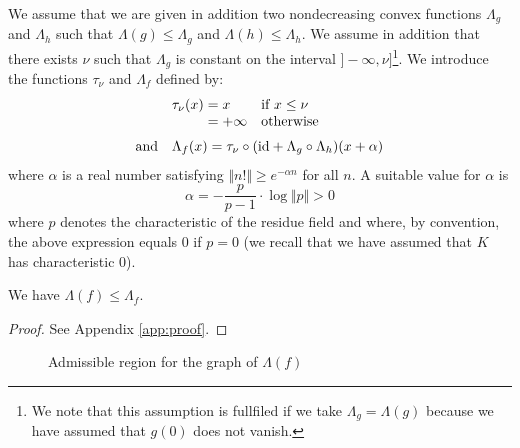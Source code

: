 \documentclass{sig-alternate}
\begin{document}
We assume that we are given in addition two nondecreasing convex 
functions $\Lambda_g$ and $\Lambda_h$ such that $\Lambda(g) \leq 
\Lambda_g$ and $\Lambda(h) \leq \Lambda_h$. We assume in addition that 
there exists $\nu$ such that $\Lambda_g$ is constant on the interval 
$]{-}\infty, \nu]$\footnote{We note that this assumption is fullfiled if 
we take $\Lambda_g = \Lambda(g)$ because we have assumed that $g(0)$ 
does not vanish.}. We introduce the functions $\tau_\nu$ and $\Lambda_f$ 
defined by:
$$\begin{array}{rll}
&\tau_\nu(x) = x & \text{if } x \leq \nu \\
& \hphantom{\tau_\nu(x)} = {+} \infty & \text{otherwise} \medskip \\
\text{and} &
\multicolumn{2}{l}{\Lambda_f(x) = 
  \tau_\nu \circ (\id + \Lambda_g \circ \Lambda_h)(x + \alpha)}
\end{array}$$
where $\alpha$ is a real number satisfying $\Vert n! \Vert \geq 
e^{-\alpha n}$ for all $n$. A suitable value for $\alpha$ is 
$$\alpha = - \frac p {p-1} \cdot \log \Vert p \Vert > 0$$ 
where $p$ denotes the characteristic of the residue field and where, by 
convention, the above expression equals $0$ if $p = 0$ (we recall that 
we have assumed that $K$ has characteristic $0$).

\begin{prop}
\label{prop:boundLambdaf}\label{PROP:BOUNDLAMBDAF}
We have $\Lambda(f) \leq \Lambda_f$.
\end{prop}

\begin{proof}
See Appendix \ref{app:proof}.
\end{proof}

\begin{figure}
\null \hfill
{}
\hfill \null

\caption{Admissible region for the graph of $\Lambda(f)$}
\label{fig:area}
\end{figure}
\end{document}
